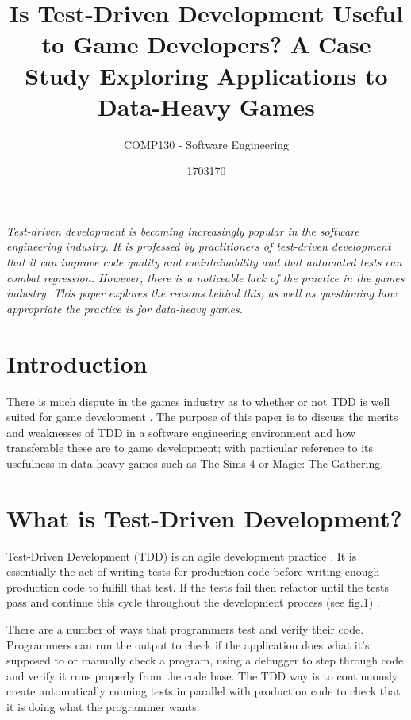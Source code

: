 \documentclass{scrartcl}
\title{Is Test-Driven Development Useful to Game Developers? 
A Case Study Exploring Applications to Data-Heavy Games}
\subtitle{COMP130 - Software Engineering}
\author{1703170}
\begin{document}
\maketitle

\textit{Test-driven development is becoming increasingly popular in the software engineering industry. It is professed by practitioners of test-driven development that it can improve code quality and maintainability and that automated tests can combat regression. However, there is a noticeable lack of the practice in the games industry. This paper explores the reasons behind this, as well as questioning how appropriate the practice is for data-heavy games.  }



\section*{Introduction}

There is much dispute in the games industry as to whether or not TDD is well suited for game development \cite{GameDev}\cite{GameDev2}. The purpose of this paper is to discuss the merits and weaknesses of TDD in a software engineering environment and how transferable these are to game development; with particular reference to its usefulness in data-heavy games such as The Sims 4 or Magic: The Gathering.



\section*{What is Test-Driven Development?}

Test-Driven Development (TDD) is an agile development practice \cite{beck2001manifesto}. It is essentially the act of writing tests for production code before writing enough production code to fulfill that test. If the tests fail then refactor until the tests pass and continue this cycle throughout the development process (see fig.1) \cite{beck2003test}.

There are a number of ways that programmers test and verify their code. Programmers can run the output to check if the application does what it's supposed to or manually check a program, using a debugger to step through code and verify it runs properly from the code base. The TDD way is to continuously create automatically running tests in parallel with production code to check that it is doing what the programmer wants.
\end{document}
